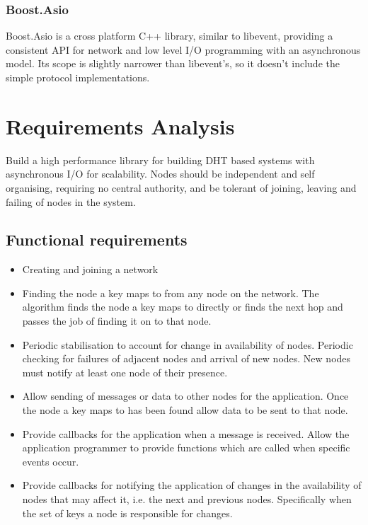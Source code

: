 \documentclass{article}
\begin{document}
\subsubsection{Boost.Asio}
Boost.Asio\cite{basio} is a cross platform C++ library, similar to libevent, providing a consistent API for network and low level I/O programming with an asynchronous model. Its scope is slightly narrower than libevent's, so it doesn't include the simple protocol implementations.




\section{Requirements Analysis}
Build a high performance library for building DHT based systems with asynchronous I/O for scalability. Nodes should be independent and self organising, requiring no central authority, and be tolerant of joining, leaving and failing of nodes in the system.

\subsection{Functional requirements}
\begin{itemize}
\item
Creating and joining a network
\item
Finding the node a key maps to from any node on the network.
The algorithm finds the node a key maps to directly or finds the next hop and passes the job of finding it on to that node.
\item
Periodic stabilisation to account for change in availability of nodes.
Periodic checking for failures of adjacent nodes and arrival of new nodes. New nodes must notify at least one node of their presence.
\item
Allow sending of messages or data to other nodes for the application.
Once the node a key maps to has been found allow data to be sent to that node.
\item
Provide callbacks for the application when a message is received.
Allow the application programmer to provide functions which are called when specific events occur.
\item
Provide callbacks for notifying the application of changes in the availability of nodes that may affect it, i.e. the next and previous nodes. Specifically when the set of keys a node is responsible for changes.
\end{itemize}
\end{document}
